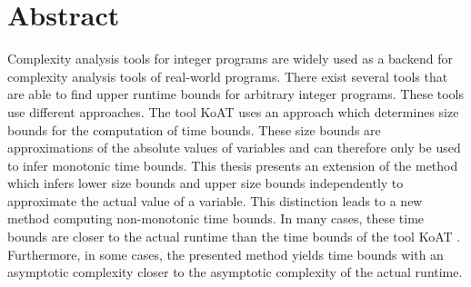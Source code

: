\chapter*{Abstract}

Complexity analysis tools for integer programs are widely used as a backend for complexity analysis tools of real-world programs.
There exist several tools that are able to find upper runtime bounds for arbitrary integer programs.
These tools use different approaches.
The tool KoAT \cite{koat} uses an approach which determines size bounds for the computation of time bounds.
These size bounds are approximations of the absolute values of variables and can therefore only be used to infer monotonic time bounds.
This thesis presents an extension of the method which infers lower size bounds and upper size bounds independently to approximate the actual value of a variable.
This distinction leads to a new method computing non-monotonic time bounds.
In many cases, these time bounds are closer to the actual runtime than the time bounds of the tool KoAT \cite{koat}.
Furthermore, in some cases, the presented method yields time bounds with an asymptotic complexity closer to the asymptotic complexity of the actual runtime. 
